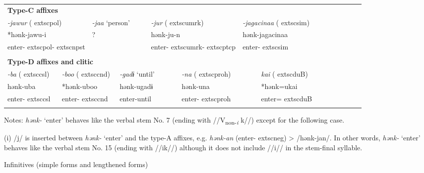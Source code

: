 \begin{tabularx}{\textwidth}{XXXXXXXXXXXXXXXXXXXXXX}
\multicolumn{22}{X}{{\bfseries Type-C affixes}}\\
\multicolumn{3}{X}{{ \textit{{}-jawur} (	extsc{pol})}} & \multicolumn{4}{X}{{ \textit{{}-jaa} ‘person’}} & \multicolumn{4}{X}{{ \textit{{}-jur} (	extsc{umrk})}} & \multicolumn{4}{X}{{ \textit{{}-jagacinaa} (	extsc{sim})}} & \multicolumn{7}{X}{}\\
\multicolumn{3}{X}{{ *hənk-jawu-i}} & \multicolumn{4}{X}{?} & \multicolumn{4}{X}{{ hənk-ju-n}} & \multicolumn{4}{X}{{ hənk-jagacinaa}} & \multicolumn{7}{X}{}\\
\multicolumn{3}{X}{enter-	extsc{pol}-	extsc{npst}} & \multicolumn{4}{X}{} & \multicolumn{4}{X}{enter-	extsc{umrk}-	extsc{ptcp}} & \multicolumn{4}{X}{enter-	extsc{sim}} & \multicolumn{7}{X}{}\\
\multicolumn{22}{X}{}\\
\multicolumn{22}{X}{{\bfseries Type-D affixes and clitic}}\\
\multicolumn{2}{X}{{ \textit{{}-ba} (	extsc{csl})}} & \multicolumn{2}{X}{{ \textit{{}-boo} (	extsc{cnd})}} & \multicolumn{4}{X}{{ \textit{{}-gadɨ} ‘until’}} & \multicolumn{4}{X}{{ \textit{{}-na} (	extsc{proh})}} & \multicolumn{4}{X}{{ \textit{kai} (	extsc{du}B)}} & \multicolumn{6}{X}{}\\
\multicolumn{2}{X}{{ hənk-uba}} & \multicolumn{2}{X}{{ *hənk-uboo}} & \multicolumn{4}{X}{{ hənk-ugadɨ}} & \multicolumn{4}{X}{{ hənk-una}} & \multicolumn{4}{X}{{ *hənk=ukai}} & \multicolumn{6}{X}{}\\
\multicolumn{2}{X}{enter-	extsc{csl}} & \multicolumn{2}{X}{enter-	extsc{cnd}} & \multicolumn{4}{X}{enter-until} & \multicolumn{4}{X}{enter-	extsc{proh}} & \multicolumn{4}{X}{enter=	extsc{du}B} & \multicolumn{6}{X}{}\\
\lspbottomrule
\end{tabularx}
Notes: \textit{hənk-} ‘enter’ behaves like the verbal stem No. 7 (ending with //V\textsubscript{non-}\textit{\textsubscript{i}} k//) except for the following case.

(i)  /j/ is inserted between \textit{hənk-} ‘enter’ and the type-A affixes, e.g. \textit{hənk-an} (enter-	extsc{neg}) > /hənk-jan/. In other words, \textit{hənk-} ‘enter’ behaves like the verbal stem No. 15 (ending with //ik//) although it does not include //i// in the stem-final syllable.

Infinitives (simple forms and lengthened forms)

\tablefirsthead{}

